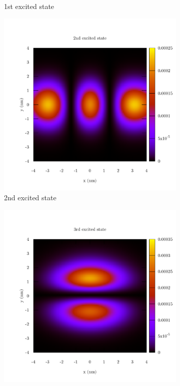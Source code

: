 \documentclass[12pt,a4]{article}
\begin{document}
\begin{figure}[H]
\begin{subfigure}{.33\textwidth}
	\caption{1st excited state}
	\end{subfigure}
	\begin{subfigure}{.33\textwidth}
	\includegraphics[width=\textwidth]{../plots/state_2.pdf}
	\caption{2nd excited state}
	\end{subfigure}
	\begin{subfigure}{.33\textwidth}
	\includegraphics[width=\textwidth]{../plots/state_3.pdf}

\end{subfigure}
\end{figure}
\end{document}
